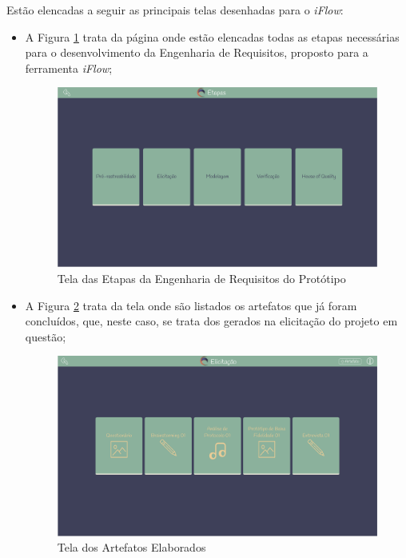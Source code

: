Estão elencadas a seguir as principais telas desenhadas para o \textit{iFlow}:

\begin{itemize}
    \item A Figura \ref{fig:cards_etapas_prototipo} trata da página onde estão elencadas todas as etapas necessárias para o desenvolvimento da Engenharia de Requisitos, proposto para a ferramenta \textit{iFlow};
    \begin{figure}[H]
      \begin{center}
          \caption{{Tela das Etapas da Engenharia de Requisitos do Protótipo}}
          \label{fig:cards_etapas_prototipo}
          \includegraphics[scale=0.35]{figuras/Prototipo/etapas.png}
    \end{center}
    \end{figure}
    \item A Figura \ref{fig:completed_artifacts} trata da tela onde são listados os artefatos que já foram concluídos, que, neste caso, se trata dos gerados na elicitação do projeto em questão;
    \begin{figure}[H]
      \begin{center}
          \caption{{Tela dos Artefatos Elaborados}}
          \label{fig:completed_artifacts}
          \includegraphics[scale=0.3]{figuras/Prototipo/completed-artifacts.png}

\end{center}
\end{figure}
\end{itemize}
